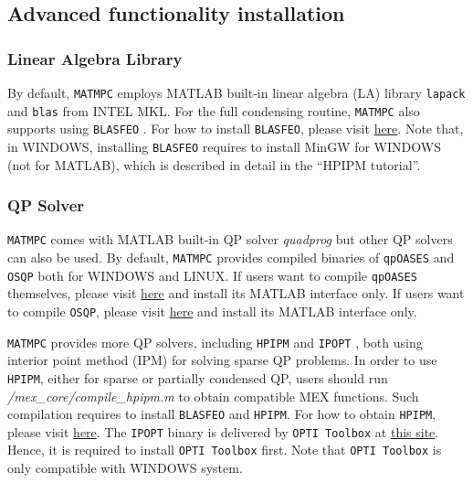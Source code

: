 \documentclass{article}
\newcommand{\software}[1]{{\tt#1}}
\begin{document}
\subsection{Advanced functionality installation}

\subsubsection{Linear Algebra Library}
By default, \software{MATMPC} employs MATLAB built-in linear algebra (LA) library \software{lapack} and \software{blas} from INTEL MKL. For the full condensing routine, \software{MATMPC} also supports using \software{BLASFEO} \cite{frison2018blasfeo}. For how to install \software{BLASFEO}, please visit \href{https://github.com/giaf/blasfeo}{here}. Note that, in WINDOWS, installing \software{BLASFEO} requires to install MinGW for WINDOWS (not for MATLAB), which is described in detail in the ``HPIPM tutorial''.

\subsubsection{QP Solver}
\software{MATMPC} comes with MATLAB built-in QP solver \emph{quadprog} but other QP solvers can also be used. By default, \software{MATMPC} provides compiled binaries of \software{qpOASES} \cite{ferreau2014qpoases} and \software{OSQP} \cite{stellato2018osqp} both for WINDOWS and LINUX. If users want to compile \software{qpOASES} themselves, please visit \href{https://projects.coin-or.org/qpOASES/wiki/QpoasesInstallation}{here} and install its MATLAB interface only. If users want to compile \software{OSQP}, please visit \href{https://osqp.org/}{here} and install its MATLAB interface only.

\software{MATMPC} provides more QP solvers, including \software{HPIPM} and \software{IPOPT} \cite{wachter2006implementation}, both using interior point method (IPM) for solving sparse QP problems. In order to use \software{HPIPM}, either for sparse or partially condensed QP, users should run \emph{/mex\_core/compile\_hpipm.m} to obtain compatible MEX functions. Such compilation requires to install \software{BLASFEO} and \software{HPIPM}. For how to obtain \software{HPIPM}, please visit \href{https://github.com/giaf/hpipm}{here}. The \software{IPOPT} binary is delivered by \software{OPTI Toolbox} at \href{https://www.inverseproblem.co.nz/OPTI/}{this site}. Hence, it is required to install \software{OPTI Toolbox} first. Note that \software{OPTI Toolbox} is only compatible with WINDOWS system.
\end{document}
